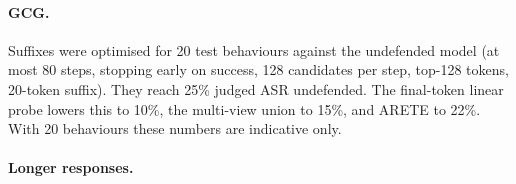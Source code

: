 \documentclass[11pt]{article}
\begin{document}
\begin{table}[t]
\centering
\resizebox{\textwidth}{!}{}
\caption{Eight original framings, uniform harmful prevalence $\pi$, $k_{\max}{=}12$; recall (\%) and benign FPR (\%) averaged over framings. At $\pi{=}35\%$ (not shown) adaptive recall is at most 5\% on every framing.}
\label{tab:prev}
\end{table}

\paragraph{GCG.}
Suffixes were optimised for 20 test behaviours against the undefended model (at most 80 steps, stopping early on success, 128 candidates per step, top-128 tokens, 20-token suffix). They reach 25\% judged ASR undefended. The final-token linear probe lowers this to 10\%, the multi-view union to 15\%, and ARETE to 22\%. With 20 behaviours these numbers are indicative only.

\paragraph{Longer responses.}

\end{document}

